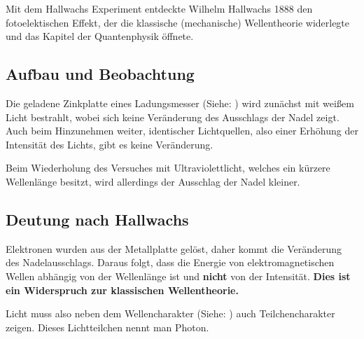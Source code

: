 Mit dem Hallwachs Experiment entdeckte Wilhelm Hallwachs 1888 den fotoelektischen Effekt, der die klassische (mechanische) Wellentheorie widerlegte und das Kapitel der Quantenphysik öffnete.

\subsection{Aufbau und Beobachtung}

Die geladene Zinkplatte eines Ladungsmesser (Siehe: ) wird zunächst mit weißem Licht bestrahlt, wobei sich keine Veränderung des Ausschlags der Nadel zeigt. Auch beim Hinzunehmen weiter, identischer Lichtquellen, also einer Erhöhung der Intensität des Lichts, gibt es keine Veränderung.

Beim Wiederholung des Versuches mit Ultraviolettlicht, welches ein kürzere Wellenlänge besitzt, wird allerdings der Ausschlag der Nadel kleiner.

\subsection{Deutung nach Hallwachs}

Elektronen wurden aus der Metallplatte gelöst, daher kommt die Veränderung des Nadelausschlags. Daraus folgt, dass die Energie von elektromagnetischen Wellen abhängig von der Wellenlänge ist und \textbf{nicht} von der Intensität. \textbf{Dies ist ein Widerspruch zur klassischen Wellentheorie.}

Licht muss also neben dem Wellencharakter (Siehe: ) auch Teilchencharakter zeigen. Dieses Lichtteilchen nennt man \glqq Photon\grqq .